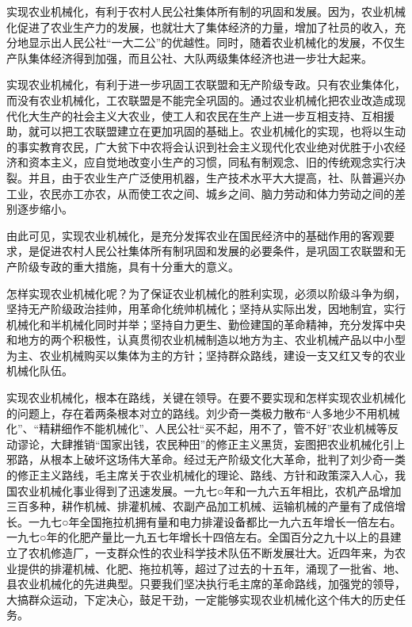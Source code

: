 \documentclass{book}
\begin{document}
实现农业机械化，有利于农村人民公社集体所有制的巩固和发展。因为，农业机械化促进了农业生产力的发展，也就壮大了集体经济的力量，增加了社员的收入，充分地显示出人民公社“一大二公”的优越性。同时，随着农业机械化的发展，不仅生产队集体经济得到加强，而且公社、大队两级集体经济也进一步壮大起来。

实现农业机械化，有利于进一步巩固工农联盟和无产阶级专政。只有农业集体化，而没有农业机械化，工农联盟是不能完全巩固的。通过农业机械化把农业改造成现代化大生产的社会主义大农业，使工人和农民在生产上进一步互相支持、互相援助，就可以把工农联盟建立在更加巩固的基础上。农业机械化的实现，也将以生动的事实教育农民，广大贫下中农将会认识到社会主义现代化农业绝对优胜于小农经济和资本主义，应自觉地改变小生产的习惯，同私有制观念、旧的传统观念实行决裂。并且，由于农业生产广泛使用机器，生产技术水平大大提高，社、队普遍兴办工业，农民亦工亦农，从而使工农之间、城乡之间、脑力劳动和体力劳动之间的差别逐步缩小。

由此可见，实现农业机械化，是充分发挥农业在国民经济中的基础作用的客观要求，是促进农村人民公社集体所有制巩固和发展的必要条件，是巩固工农联盟和无产阶级专政的重大措施，具有十分重大的意义。

怎样实现农业机械化呢？为了保证农业机械化的胜利实现，必须以阶级斗争为纲，坚持无产阶级政治挂帅，用革命化统帅机械化；坚持从实际出发，因地制宜，实行机械化和半机械化同时并举；坚持自力更生、勤俭建国的革命精神，充分发挥中央和地方的两个积极性，认真贯彻农业机械制造以地方为主、农业机械产品以中小型为主、农业机械购买以集体为主的方针；坚持群众路线，建设一支又红又专的农业机械化队伍。

实现农业机械化，根本在路线，关键在领导。在要不要实现和怎样实现农业机械化的问题上，存在着两条根本对立的路线。刘少奇一类极力散布“人多地少不用机械化”、“精耕细作不能机械化”、人民公社“买不起，用不了，管不好”农业机械等反动谬论，大肆推销“国家出钱，农民种田”的修正主义黑货，妄图把农业机械化引上邪路，从根本上破坏这场伟大革命。经过无产阶级文化大革命，批判了刘少奇一类的修正主义路线，毛主席关于农业机械化的理论、路线、方针和政策深入人心，我国农业机械化事业得到了迅速发展。一九七○年和一九六五年相比，农机产品增加三百多种，耕作机械、排灌机械、农副产品加工机械、运输机械的产量有了成倍增长。一九七○年全国拖拉机拥有量和电力排灌设备都比一九六五年增长一倍左右。一九七○年的化肥产量比一九五七年增长十四倍左右。全国百分之九十以上的县建立了农机修造厂，一支群众性的农业科学技术队伍不断发展壮大。近四年来，为农业提供的排灌机械、化肥、拖拉机等，超过了过去的十五年，涌现了一批省、地、县农业机械化的先进典型。只要我们坚决执行毛主席的革命路线，加强党的领导，大搞群众运动，下定决心，鼓足干劲，一定能够实现农业机械化这个伟大的历史任务。
\end{document}
